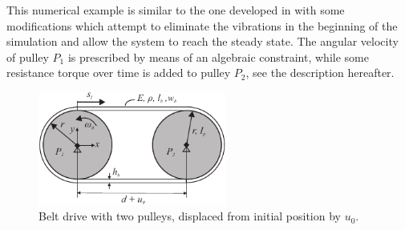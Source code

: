 %
This numerical example is similar to the one developed in \cite{Pechstein2013} with some modifications which attempt to eliminate the vibrations in the beginning of the simulation and allow the system to reach the steady state. The angular velocity of pulley $P_1$ is prescribed by means of an algebraic constraint, while some resistance torque over time is added to pulley $P_2$, see the description hereafter.
\begin{figure}[tbph]
    \centering
    \includegraphics[width=0.55\textwidth]{figures/ESR8_beltPechstein.pdf}
    \caption{Belt drive with two pulleys, displaced from initial position by $u_0$.}
    \label{fig:ESR8_BeltDrive}
\end{figure}
